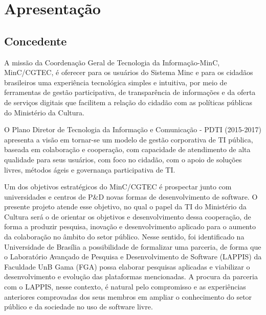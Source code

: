 

\section{Apresentação}
\subsection{Concedente}

A missão da Coordenação Geral de Tecnologia da Informação-MinC, MinC/CGTEC, é oferecer para os usuários do Sistema Minc e para os cidadãos brasileiros uma
experiência tecnológica simples e intuitiva, por meio de ferramentas de gestão
participativa, de transparência de informações e da oferta de serviços digitais que facilitem
a relação do cidadão com as políticas públicas do Ministério da Cultura.

O Plano Diretor de Tecnologia da Informação e Comunicação - PDTI (2015-2017) apresenta a visão em 
tornar-se um modelo de gestão corporativa de TI pública, baseada em colaboração e
cooperação, com capacidade de atendimento de alta qualidade para seus usuários, com
foco no cidadão, com o apoio de soluções livres, métodos ágeis e governança participativa
de TI.

Um dos objetivos estratégicos do MinC/CGTEC é prospectar junto com universidades e
centros de P\&D novas formas de desenvolvimento de software. O presente projeto 
atende esse objetivo, no qual o papel da TI do Ministério da Cultura 
será o de orientar os objetivos e
desenvolvimento dessa cooperação, de forma a produzir pesquisa, inovação e
desenvolvimento aplicado para o aumento da colaboração no âmbito do setor
público. Nesse sentido, foi identificado na Universidade de Brasília a
possibilidade de formalizar uma parceria, de forma que o Laboratório Avançado
de Pesquisa e Desenvolvimento de Software (LAPPIS) da Faculdade UnB Gama (FGA)
possa elaborar pesquisas aplicadas e viabilizar o desenvolvimento e evolução
das plataformas mencionadas. A procura da parceria com o LAPPIS, nesse
contexto, é natural pelo compromisso e as experiências anteriores comprovadas
dos seus membros em ampliar o conhecimento do setor público e da sociedade no
uso de software livre.

